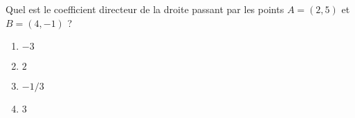 
\begin{exercice}\label{exosmath-0394}

    Quel est le coefficient directeur de la droite passant par les points \( A=(2,5)\) et \( B=(4,-1)\) ?
    \begin{multicols}{2}
        \begin{enumerate}
            \item
                \( -3\)
            \item
                \( 2\)
            \item
                \( -1/3\)
            \item
                \( 3\)
        \end{enumerate}
    \end{multicols}

\end{exercice}
